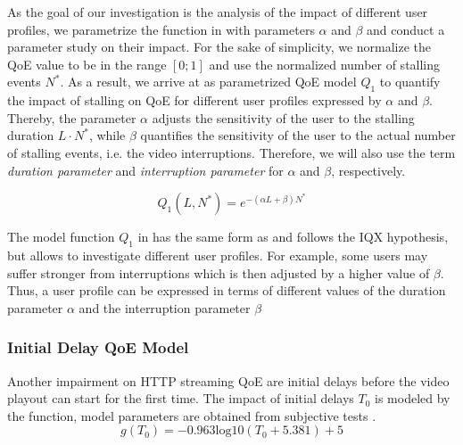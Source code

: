 As the goal of our investigation is the analysis of the impact of different user profiles, we parametrize the function in  with parameters \(\alpha\) and \(\beta\) and conduct a parameter study on their impact. 
For the sake of simplicity, we normalize the QoE value to be in the range \(\left[0;1\right]\)  and use the normalized number of stalling events $N^*$. 
As a result, we arrive at  as parametrized \gls{QoE} model \(Q_1\) to quantify the impact of stalling on QoE for different user profiles expressed by \(\alpha\) and \(\beta\). 
Thereby, the parameter \(\alpha\) adjusts the sensitivity of the user to the stalling duration \(L\cdot N^*\), while \(\beta\) quantifies the sensitivity of the user to the actual number of stalling events, i.e. the video interruptions.
Therefore, we will also use the term \emph{duration parameter} and \emph{interruption parameter} for \(\alpha\) and \(\beta\), respectively.

\begin{equation}
   Q_1(L,N^*) = e^{-\left( \alpha L + \beta\right) N^*} 
\label{eq:application:qoe_user_behaviour:typical_user_scenarios:youtube_qoe:stalling:parameterized_model}
\end{equation}

The model function \(Q_1\) in  has the same form as  and follows the IQX hypothesis, but allows to investigate different user profiles.
For example, some users may suffer stronger from interruptions which is then adjusted by a higher value of \(\beta\).
Thus, a user profile can be expressed in terms of different values of the duration parameter \(\alpha\) and the interruption parameter \(\beta\)

\subsubsection*{Initial Delay QoE Model}\label{sec:application:qoe_user_behaviour:typical_user_scenarios:initial_delay}
Another impairment on \gls{HTTP} streaming \gls{QoE} are initial delays before the video playout can start for the first time.
The impact of initial delays \(T_0\) is modeled by the function, model parameters are obtained from subjective tests \cite{Hossfeld2012c}. 
\begin{equation}
g(T_0)=-0.963 \mathrm{log10}(T_0 + 5.381) + 5
\label{eq:application:qoe_user_behaviour:typical_user_scenarios:initial_delay:original_model}
\end{equation}

